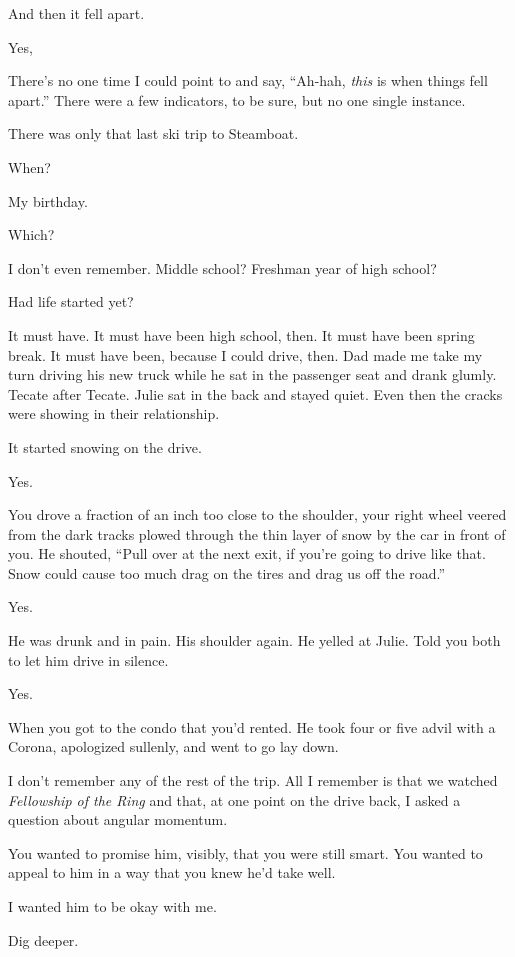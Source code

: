 \begin{paracol}{2}
\begin{leftcolumn}
And then it fell apart.

\begin{ally}
Yes,
\end{ally}
There's no one time I could point to and say, ``Ah-hah, \emph{this} is when things fell apart.'' There were a few indicators, to be sure, but no one single instance.

There was only that last ski trip to Steamboat.

\begin{ally}
When?
\end{ally}
My birthday.

\begin{ally}
Which?
\end{ally}
I don't even remember. Middle school? Freshman year of high school?

\begin{ally}
Had life started yet?
\end{ally}
It must have. It must have been high school, then. It must have been spring break. It must have been, because I could drive, then. Dad made me take my turn driving his new truck while he sat in the passenger seat and drank glumly. Tecate after Tecate. Julie sat in the back and stayed quiet. Even then the cracks were showing in their relationship.

\begin{ally}
It started snowing on the drive.
\end{ally}
Yes.

\begin{ally}
You drove a fraction of an inch too close to the shoulder, your right wheel veered from the dark tracks plowed through the thin layer of snow by the car in front of you. He shouted, ``Pull over at the next exit, if you're going to drive like that. Snow could cause too much drag on the tires and drag us off the road.''
\end{ally}
Yes.

\begin{ally}
He was drunk and in pain. His shoulder again. He yelled at Julie. Told you both to let him drive in silence.
\end{ally}
Yes.

\begin{ally}
When you got to the condo that you'd rented. He took four or five advil with a Corona, apologized sullenly, and went to go lay down.
\end{ally}
I don't remember any of the rest of the trip. All I remember is that we watched \emph{Fellowship of the Ring} and that, at one point on the drive back, I asked a question about angular momentum.

\begin{ally}
You wanted to promise him, visibly, that you were still smart. You wanted to appeal to him in a way that you knew he'd take well.
\end{ally}
I wanted him to be okay with me.

\begin{ally}
Dig deeper.
\end{ally}
\newpage
\end{leftcolumn}
\end{paracol}

